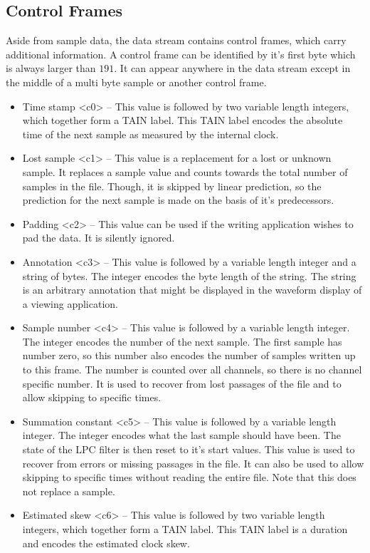\documentclass[DIV=10]{scrartcl}
\begin{document}
\subsection{Control Frames}
\label{controlframes}

Aside from sample data, the data stream contains control frames, which carry additional information.
A control frame can be identified by it’s first byte which is always larger than \(191\).
It can appear anywhere in the data stream except in the middle of a multi byte sample or another control frame.

\begin{itemize}
  \item Time stamp <c0> – This value is followed by two variable length integers, which together form a TAIN label.
  This TAIN label encodes the absolute time of the next sample as measured by the internal clock.
  \item Lost sample <c1> – This value is a replacement for a lost or unknown sample.
  It replaces a sample value and counts towards the total number of samples in the file.
  Though, it is skipped by linear prediction, so the prediction for the next sample is made on the basis of it’s predecessors.
  \item Padding <c2> – This value can be used if the writing application wishes to pad the data.
  It is silently ignored.
  \item Annotation <c3> – This value is followed by a variable length integer and a string of bytes.
  The integer encodes the byte length of the string.
  The string is an arbitrary annotation that might be displayed in the waveform display of a viewing application.
  \item Sample number <c4> – This value is followed by a variable length integer.
  The integer encodes the number of the next sample.
  The first sample has number zero, so this number also encodes the number of samples written up to this frame.
  The number is counted over all channels, so there is no channel specific number.
  It is used to recover from lost passages of the file and to allow skipping to specific times.
  \item Summation constant <c5> – This value is followed by a variable length integer.
  The integer encodes what the last sample should have been.
  The state of the LPC filter is then reset to it’s start values.
  This value is used to recover from errors or missing passages in the file.
  It can also be used to allow skipping to specific times without reading the entire file.
  Note that this does not replace a sample.
  \item Estimated skew <c6> – This value is followed by two variable length integers, which together form a TAIN label.
  This TAIN label is a duration and encodes the estimated clock skew.
\end{itemize}
\end{document}
